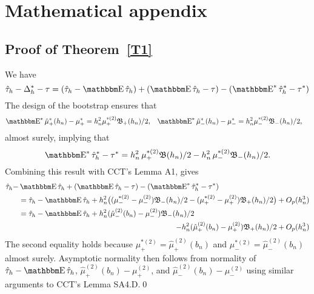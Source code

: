 \documentclass[12pt,fleqn]{article}
\begin{document}
\appendix
\section{Mathematical appendix}
\subsection{Proof of Theorem~\ref{T1}}
We have
\begin{equation*}
  \hat\tau_h - \Delta^*_h - \tau = (\hat\tau_h - \E \hat \tau_h) +
  (\E \hat \tau_h - \tau) - (\E^* \hat \tau^*_h - \tau^*)
\end{equation*}
The design of the bootstrap ensures that
\begin{align*}
  \label{eq:6}
  \E^* \hat\mu_{+}^*(h_n) - \mu_{+}^{*}
  &= h_n^{2} \mu_+^{*(2)} \Bf_{+}(h_n)/2,
  &\E^* \hat\mu_{-}^*(h_n) - \mu_{-}^{*}
  &= h_n^{2} \mu_-^{*(2)} \Bf_{-}(h_n)/2,
\end{align*}
almost surely, implying that
\begin{equation*}
  \label{eq:7}
    \E^* \hat\tau^{*}_h - \tau^{*} = h_n^2\, \mu_+^{*(2)} \Bf(h_n)/2
      - h_n^2\, \mu_{-}^{*(2)} \Bf_{-}(h_n)/2.
\end{equation*}
Combining this result with CCT's Lemma A1, gives
\begin{align}
  \hat\tau_h - & \E \hat\tau_h + (\E \hat\tau_h - \tau) - (\E^* \hat\tau^*_h - \tau^*)\notag \\
  &= \hat\tau_h - \E\hat\tau_h
   + h_n^2 \big((\mu_{-}^{*(2)} - \mu_{-}^{(2)}) \Bf_{-}(h_{n}) /2
   - (\mu_+^{*(2)}-\mu_+^{(2)}) \Bf_{+}(h_{n}) / 2 \big) + O_p(h_n^{3}) \\
  &= \hat\tau_h - \E\hat\tau_h
   + h_n^2 (\hat\mu_-^{(2)}(b_n) - \mu_-^{(2)}) \Bf_{-}(h_{n}) /2 \notag \\
  \label{eq:8}
  &\pushright{- h_n^2 (\hat\mu_+^{(2)}(b_n) - \mu_+^{(2)}) \Bf_{+}(h_{n}) / 2 + O_p(h_n^{3})}
\end{align}
The second equality holds because
$\mu_+^{*(2)} = \hat\mu_{+}^{(2)}(b_n)$ and
$\mu_-^{*(2)} = \hat\mu_{-}^{(2)}(b_n)$ almost surely. Asymptotic
normality then follows from normality of $\hat\tau_h - \E\hat\tau_h$,
$\hat\mu_+^{(2)}(b_n) - \mu_+^{(2)}$, and
$\hat\mu_-^{(2)}(b_n) - \mu_-^{(2)}$ using similar arguments to
CCT's Lemma SA4.D.\qed
\end{document}
